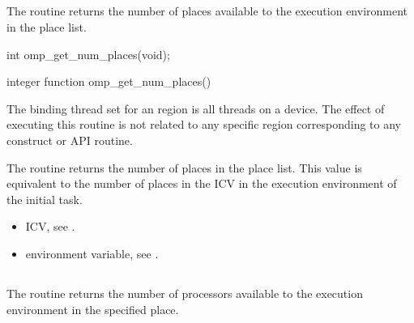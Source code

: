 
\subsection{}
\label{subsec:omp_get_num_places}
\summary
The  routine returns the number of places 
available to the execution environment in the place list.

\format
\ccppspecificstart
\begin{boxedcode}
int omp\_get\_num\_places(void);
\end{boxedcode}
\ccppspecificend

\fortranspecificstart
\begin{boxedcode}
integer function omp\_get\_num\_places()
\end{boxedcode}
\fortranspecificend

\binding
The binding thread set for an   region is all threads on a device. The effect of executing this routine is not related to any specific region corresponding to any construct or API routine.

\effect

The  routine returns the number of places in the place list. This value is equivalent to the number of places in the   ICV in the execution environment of the initial task.

\crossreferences
\begin{itemize}
\item {} ICV, see 
.

\item {} environment variable, see 
.
\end{itemize}





\subsection{}
\label{subsec:omp_get_place_num_procs}

\summary
The   routine returns the number of processors available to the execution environment in the specified place.


